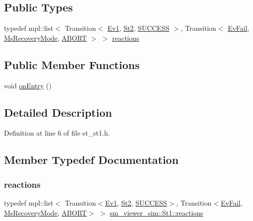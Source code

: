 \subsection*{Public Types}
\begin{DoxyCompactItemize}
\item 
typedef mpl\+::list$<$ Transition$<$ \hyperlink{structsm__viewer__sim_1_1Ev1}{Ev1}, \hyperlink{structsm__viewer__sim_1_1St2}{St2}, \hyperlink{structsmacc_1_1default__transition__tags_1_1SUCCESS}{S\+U\+C\+C\+E\+SS} $>$, Transition$<$ \hyperlink{structsm__viewer__sim_1_1EvFail}{Ev\+Fail}, \hyperlink{structsm__viewer__sim_1_1MsRecoveryMode}{Ms\+Recovery\+Mode}, \hyperlink{structsmacc_1_1default__transition__tags_1_1ABORT}{A\+B\+O\+RT} $>$ $>$ \hyperlink{structsm__viewer__sim_1_1St1_af59d80d7454a2683c4b161f2c9a12b18}{reactions}
\end{DoxyCompactItemize}
\subsection*{Public Member Functions}
\begin{DoxyCompactItemize}
\item 
void \hyperlink{structsm__viewer__sim_1_1St1_ab4651cd52d9db7f7e8a4496d8214bfbe}{on\+Entry} ()
\end{DoxyCompactItemize}


\subsection{Detailed Description}


Definition at line 6 of file st\+\_\+st1.\+h.



\subsection{Member Typedef Documentation}
\mbox{\label{structsm__viewer__sim_1_1St1_af59d80d7454a2683c4b161f2c9a12b18}} 
\subsubsection{\texorpdfstring{reactions}{reactions}}
{\footnotesize\ttfamily typedef mpl\+::list$<$ Transition$<$\hyperlink{structsm__viewer__sim_1_1Ev1}{Ev1}, \hyperlink{structsm__viewer__sim_1_1St2}{St2}, \hyperlink{structsmacc_1_1default__transition__tags_1_1SUCCESS}{S\+U\+C\+C\+E\+SS}$>$, Transition$<$\hyperlink{structsm__viewer__sim_1_1EvFail}{Ev\+Fail}, \hyperlink{structsm__viewer__sim_1_1MsRecoveryMode}{Ms\+Recovery\+Mode}, \hyperlink{structsmacc_1_1default__transition__tags_1_1ABORT}{A\+B\+O\+RT}$>$ $>$ \hyperlink{structsm__viewer__sim_1_1St1_af59d80d7454a2683c4b161f2c9a12b18}{sm\+\_\+viewer\+\_\+sim\+::\+St1\+::reactions}}



